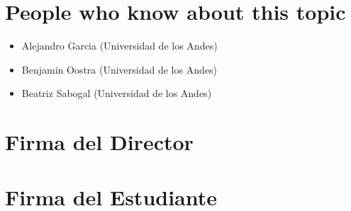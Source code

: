 \documentclass[12pt]{article}
\begin{document}
\section{People who know about this topic}


\begin{itemize}
	\item Alejandro Garcia (Universidad de los Andes)
	\item Benjamin Oostra (Universidad de los Andes)
	\item Beatriz Sabogal (Universidad de los Andes)
\end{itemize}







\section*{Firma del Director}
\vspace{1.5cm}

\section*{Firma del Estudiante}
\end{document}
